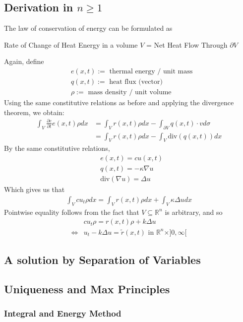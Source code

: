 \documentclass[11pt]{scrartcl}
\theoremstyle{definition}
\theoremstyle{remark}
\newcommand{\idx}[2]{\int_{#1}^{#2}}
\newcommand{\R}[0]{\mathbb{R}}
\begin{document}
\subsection{Derivation in $n \geq 1$}
The law of conservation of energy can be formulated as
\begin{center}
	Rate of Change of Heat Energy in a volume $V$ = Net Heat Flow Through $\partial V$
\end{center}
Again, define
\begin{align*}
	& e(x,t) := \text{ thermal energy / unit mass} \\
	& q(x,t) := \text{ heat flux (vector) } \\
	& \rho := \text{ mass density / unit volume} 
\end{align*}
Using the same constitutive relations as before and applying the divergence theorem, we obtain:
\begin{align*}
	\idx{V}{} \frac{\partial e}{\partial t} e(x,t) \rho dx & = \idx{V}{} r(x,t) \rho dx - \idx{\partial V}{} q(x,t) \cdot v d \sigma \\
	& = \idx{V}{} r(x,t) \rho dx - \idx{V}{} \text{div}(q(x,t)) dx 
\end{align*}
By the same constitutive relations, 
\begin{align*}
	& e(x,t) = cu(x,t) \\
	& q(x,t) = - \kappa \nabla u \\
	& \text{div}(\nabla u) = \Delta u
\end{align*}
Which gives us that
\begin{align*}
	\idx{V}{} c u_t \rho dx = \idx{V}{} r(x,t) \rho dx + \idx{V}{} \kappa \Delta u dx 
\end{align*}
Pointwise equality follows from the fact that $V \subseteq \R^n$ is arbitrary, and so
\begin{align*}
	& c u_t \rho = r(x,t)\rho + k \Delta u \\
	\iff & u_t - k \Delta u = \tilde{r}(x,t) \text{ in } \R^n \times ]0, \infty [
\end{align*}
\subsection{A solution by Separation of Variables}
\subsection{Uniqueness and Max Principles}
\subsubsection{Integral and Energy Method}
\end{document}
